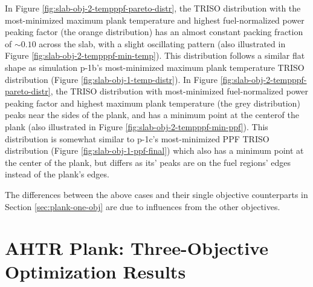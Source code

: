 In Figure \ref{fig:slab-obj-2-tempppf-pareto-distr}, the TRISO distribution with 
the most-minimized maximum plank temperature and highest fuel-normalized power peaking 
factor (the orange distribution) has an almost constant packing fraction of 
$\sim0.10$ across the slab, with a slight oscillating pattern (also illustrated in 
Figure \ref{fig:slab-obj-2-tempppf-min-temp}).
This distribution follows a similar flat shape as simulation p-1b's most-minimized 
maximum plank temperature TRISO distribution (Figure \ref{fig:slab-obj-1-temp-distr}).
In Figure \ref{fig:slab-obj-2-tempppf-pareto-distr}, the TRISO distribution with 
most-minimized fuel-normalized power peaking factor and highest maximum plank temperature 
(the grey distribution) peaks near the sides of the plank, and has a minimum point at 
the centerof the plank (also illustrated in Figure \ref{fig:slab-obj-2-tempppf-min-ppf}). 
This distribution is somewhat similar to p-1c's most-minimized PPF TRISO distribution 
(Figure \ref{fig:slab-obj-1-ppf-final}) which also has a minimum point at the center 
of the plank, but differs as its' peaks are on the fuel regions' edges instead of the 
plank's edges. 

The differences between the above cases and their single objective counterparts in 
Section \ref{sec:plank-one-obj} are due to influences from the other objectives. 

\pagebreak
\section{AHTR Plank: Three-Objective Optimization Results}
\label{sec:plank-three-obj}

